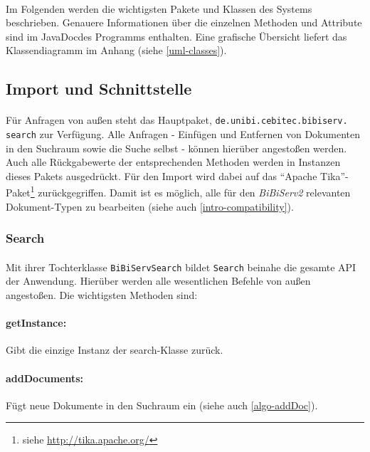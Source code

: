 \paragraph{} Im Folgenden werden die wichtigsten Pakete und Klassen des Systems beschrieben. Genauere Informationen über die einzelnen Methoden und Attribute sind im JavaDoc\texttrademark des Programms enthalten. Eine grafische Übersicht liefert das Klassendiagramm im Anhang (siehe \ref{uml-classes}).

\subsection{Import und Schnittstelle}
\label{arch-import}

\paragraph{} Für Anfragen von außen steht das Hauptpaket, \texttt{de.unibi.cebitec.bibiserv.\\search} zur Verfügung. Alle Anfragen - Einfügen und Entfernen von Dokumenten in den Suchraum sowie die Suche selbst - können hierüber angestoßen werden. Auch alle Rückgabewerte der entsprechenden Methoden werden in Instanzen dieses Pakets ausgedrückt. Für den Import wird dabei auf das "`Apache Tika"'-Paket\footnote{siehe \url{http://tika.apache.org/}} zurückgegriffen. Damit ist es möglich, alle für den \textit{BiBiServ2} relevanten Dokument-Typen zu bearbeiten (siehe auch \ref{intro-compatibility}).

\subsubsection{Search}
\label{arch-search}

\paragraph{} Mit ihrer Tochterklasse \texttt{BiBiServSearch} bildet \texttt{Search} beinahe die gesamte API der Anwendung. Hierüber werden alle wesentlichen Befehle von außen angestoßen. Die wichtigsten Methoden sind:

\paragraph{getInstance:} Gibt die einzige Instanz der search-Klasse zurück.

\paragraph{addDocuments:} Fügt neue Dokumente in den Suchraum ein (siehe auch \ref{algo-addDoc}).

